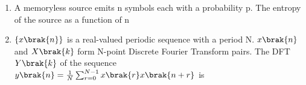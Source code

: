 \documentclass[a4paper, 11pt]{article}
\begin{document}
\begin{enumerate}
    \hfill{}
    
    \item A memoryless source emits n symbols each with a probability p. The entropy of the source as a function of n
    \begin{enumerate}
    \end{enumerate}

    \hfill{}

    \item $\{x\brak{n}\}$ is a real-valued periodic sequence with a period N. $x\brak{n}$ and $X\brak{k}$ form N-point Discrete Fourier Transform  pairs. The DFT $Y\brak{k}$ of the sequence\\ $y\brak{n} = \frac{1}{N}\sum_{r=0}^{N-1}x\brak{r}x\brak{n+r}$ is
    \begin{enumerate}
    \end{enumerate}
    
    \hfill{}
    

\end{enumerate}
\end{document}
